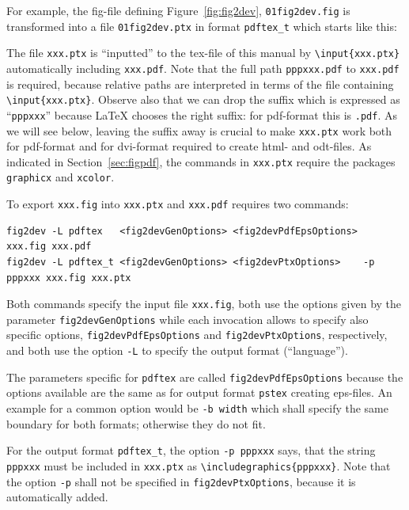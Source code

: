 \documentclass[12pt]{book}
\begin{document}
For example, the fig-file defining Figure~\ref{fig:fig2dev}, 
{\tt 01fig2dev.fig} is transformed into a file  {\tt 01fig2dev.ptx} 
in format {\tt pdftex\_t} which starts like this: 
%
\lstset{language=tex, breaklines, basicstyle=\small}


The file {\tt xxx.ptx} is ``inputted'' to the tex-file of this manual 
by {\tt\textbackslash input\{xxx.ptx\}} 
automatically including {\tt xxx.pdf}. 
Note that the full path {\tt pppxxx.pdf} to {\tt xxx.pdf} is required, 
because relative paths are interpreted in terms of the file 
containing {\tt\textbackslash input\{xxx.ptx\}}. 
Observe also that we can drop the suffix which is expressed as ``{\tt pppxxx}'' 
because \LaTeX{} chooses the right suffix: 
for pdf-format this is {\tt.pdf}. 
As we will see below, 
leaving the suffix away is crucial to make {\tt xxx.ptx} work 
both for pdf-format and for dvi-format required to create html- and odt-files. 
As indicated in Section~\ref{sec:figpdf}, 
the commands in {\tt xxx.ptx} 
require the packages {\tt graphicx} and {\tt xcolor}. 

To export {\tt xxx.fig} into {\tt xxx.ptx} and {\tt xxx.pdf} 
requires two commands: 
%
\begin{Verbatim}[fontsize=\scriptsize]
fig2dev -L pdftex   <fig2devGenOptions> <fig2devPdfEpsOptions>           xxx.fig xxx.pdf   
fig2dev -L pdftex_t <fig2devGenOptions> <fig2devPtxOptions>    -p pppxxx xxx.fig xxx.ptx
\end{Verbatim}
%
Both commands specify the input file {\tt xxx.fig}, 
both use the options given by the parameter {\tt fig2devGenOptions} 
while each invocation allows to specify also specific options, 
{\tt fig2devPdfEpsOptions} and {\tt fig2devPtxOptions}, respectively, 
and both use the option {\tt -L} to specify the output format (``language''). 


The parameters specific for {\tt pdftex} are called {\tt fig2devPdfEpsOptions} 
because the options available are the same 
as for output format {\tt pstex} creating eps-files. 
An example for a common option would be {\tt -b width} 
which shall specify the same boundary for both formats; 
otherwise they do not fit. 

For the output format {\tt pdftex\_t}, 
the option {\tt -p pppxxx} says, 
that the string {\tt pppxxx} must be included in {\tt xxx.ptx} 
as {\tt\textbackslash includegraphics\{pppxxx\}}. 
Note that the option {\tt-p} shall not be specified 
in {\tt fig2devPtxOptions}, because it is automatically added. 
\end{document}
